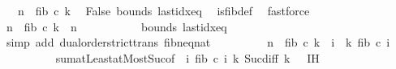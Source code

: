 \begin{isabellebody}
\ {\isachardoublequoteopen}{}\ {\isacharless}{\kern0pt}\ n\ {\isacharminus}{\kern0pt}\ fib\ {\isacharparenleft}{\kern0pt}c\ k{\isacharparenright}{\kern0pt}{\isachardoublequoteclose}\ \isamarkupfalse%
\ False\ bounds\ last{\isacharunderscore}{\kern0pt}idx{\isacharunderscore}{\kern0pt}eq{\isacharparenleft}{\kern0pt}{}{\isacharparenright}{\kern0pt}\ \isamarkupfalse%
\ is{\isacharunderscore}{\kern0pt}fib{\isacharunderscore}{\kern0pt}def\ \isamarkupfalse%
\ fastforce\isanewline
\ \ \ \ \ \ \isamarkupfalse%
\ \isamarkupfalse%
\ {\isachardoublequoteopen}n\ {\isacharminus}{\kern0pt}\ fib\ {\isacharparenleft}{\kern0pt}c\ k{\isacharparenright}{\kern0pt}\ {\isacharless}{\kern0pt}\ n{\isachardoublequoteclose}\ \isanewline
\ \ \ \ \ \ \ \ \isamarkupfalse%
\ bounds\ last{\isacharunderscore}{\kern0pt}idx{\isacharunderscore}{\kern0pt}eq\ \isamarkupfalse%
\ {\isacharparenleft}{\kern0pt}simp\ add{\isacharcolon}{\kern0pt}\ dual{\isacharunderscore}{\kern0pt}order{\isachardot}{\kern0pt}strict{\isacharunderscore}{\kern0pt}trans{}\ fib{\isacharunderscore}{\kern0pt}neq{\isacharunderscore}{\kern0pt}{}{\isacharunderscore}{\kern0pt}nat{\isacharparenright}{\kern0pt}\isanewline
\ \ \ \ \ \ \isamarkupfalse%
\ \isamarkupfalse%
\ {\isachardoublequoteopen}n\ {\isacharminus}{\kern0pt}\ fib\ {\isacharparenleft}{\kern0pt}c\ k{\isacharparenright}{\kern0pt}\ {\isacharequal}{\kern0pt}\ {\isacharparenleft}{\kern0pt}{\isasymSum}i\ {\isacharequal}{\kern0pt}\ {}{\isachardot}{\kern0pt}{\isachardot}{\kern0pt}k{\isacharminus}{\kern0pt}{}{\isachardot}{\kern0pt}\ fib\ {\isacharparenleft}{\kern0pt}c\ i{\isacharparenright}{\kern0pt}{\isacharparenright}{\kern0pt}{\isachardoublequoteclose}\ \isanewline
\ \ \ \ \ \ \ \ \isamarkupfalse%
\ sum{\isachardot}{\kern0pt}atLeast{}{\isacharunderscore}{\kern0pt}atMost{\isacharunderscore}{\kern0pt}Suc{\isacharbrackleft}{\kern0pt}of\ {\isachardoublequoteopen}{\isasymlambda}\ i{\isachardot}{\kern0pt}\ fib\ {\isacharparenleft}{\kern0pt}c\ i{\isacharparenright}{\kern0pt}{\isachardoublequoteclose}\ {\isachardoublequoteopen}k{\isacharminus}{\kern0pt}{}{\isachardoublequoteclose}{\isacharbrackright}{\kern0pt}\ Suc{\isacharunderscore}{\kern0pt}diff{\isacharunderscore}{\kern0pt}{}\ {\isacartoucheopen}k\ {\isachargreater}{\kern0pt}\ {}{\isacartoucheclose}\ IH{\isacharparenleft}{\kern0pt}{}{\isacharparenright}{\kern0pt}\ \isamarkupfalse%

\end{isabellebody}

